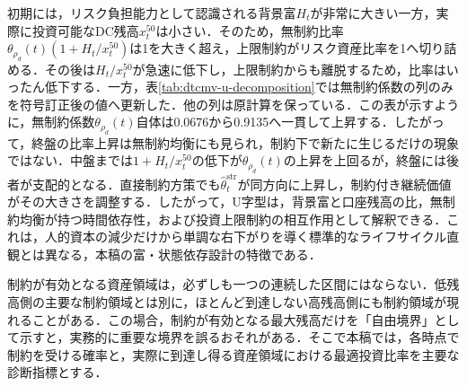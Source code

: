 \documentclass[10pt,a4paper]{article}
\theoremstyle{plain}
\theoremstyle{definition}
\begin{document}
\begin{table}[htbp]
\centering
\scriptsize
\caption{dTCMVの中央値状態におけるU字型グライドパスの要因を読むための記述的分解}
\label{tab:dtcmv-u-decomposition}
\end{table}

初期には，リスク負担能力として認識される背景富$H_t$が非常に大きい一方，実際に投資可能なDC残高$x_t^{50}$は小さい．そのため，無制約比率$\theta_{\rho_d}(t)(1+H_t/x_t^{50})$は1を大きく超え，上限制約がリスク資産比率を1へ切り詰める．その後は$H_t/x_t^{50}$が急速に低下し，上限制約からも離脱するため，比率はいったん低下する．一方，表\ref{tab:dtcmv-u-decomposition}では無制約係数の列のみを符号訂正後の値へ更新した．他の列は原計算を保っている．この表が示すように，無制約係数$\theta_{\rho_d}(t)$自体は0.0676から0.9135へ一貫して上昇する．したがって，終盤の比率上昇は無制約均衡にも見られ，制約下で新たに生じるだけの現象ではない．中盤までは$1+H_t/x_t^{50}$の低下が$\theta_{\rho_d}(t)$の上昇を上回るが，終盤には後者が支配的となる．直接制約方策でも$\widehat\theta_t^{\mathrm{str}}$が同方向に上昇し，制約付き継続価値がその大きさを調整する．したがって，U字型は，背景富と口座残高の比，無制約均衡が持つ時間依存性，および投資上限制約の相互作用として解釈できる．これは，人的資本の減少だけから単調な右下がりを導く標準的なライフサイクル直観とは異なる，本稿の富・状態依存設計の特徴である．

制約が有効となる資産領域は，必ずしも一つの連続した区間にはならない．低残高側の主要な制約領域とは別に，ほとんど到達しない高残高側にも制約領域が現れることがある．この場合，制約が有効となる最大残高だけを「自由境界」として示すと，実務的に重要な境界を誤るおそれがある．そこで本稿では，各時点で制約を受ける確率と，実際に到達し得る資産領域における最適投資比率を主要な診断指標とする．
\end{document}
